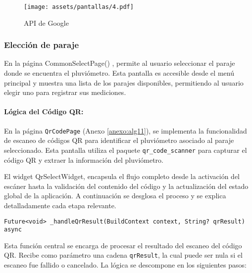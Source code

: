 \begin{figure}[h!]
\centering
  \texttt{[image: assets/pantallas/4.pdf]}
  \caption{API de Google}
  \label{pantallas4}
\end{figure}


\newpage
\subsubsection*{Elección de paraje}


En la página CommonSelectPage() %
, permite al usuario seleccionar el paraje donde se encuentra el pluviómetro. Esta pantalla es accesible desde el menú principal y muestra una lista de los parajes disponibles, permitiendo al usuario elegir uno para registrar sus mediciones.


\paragraph{Lógica del Código QR:}

En la página \texttt{QrCodePage} (Anexo \ref{anexo:alg11}), se implementa la funcionalidad de escaneo de códigos QR para identificar el pluviómetro asociado al paraje seleccionado. Esta pantalla utiliza el paquete \texttt{qr\_code\_scanner} para capturar el código QR y extraer la información del pluviómetro.



El widget QrSelectWidget, encapsula el flujo completo desde la activación del escáner hasta la validación del contenido del código y la actualización del estado global de la aplicación. A continuación se desglosa el proceso y se explica detalladamente cada etapa relevante.

\begin{verbatim}
Future<void> _handleQrResult(BuildContext context, String? qrResult) async
\end{verbatim}

Esta función central se encarga de procesar el resultado del escaneo del código QR. Recibe como parámetro una cadena \texttt{qrResult}, la cual puede ser nula si el escaneo fue fallido o cancelado. La lógica se descompone en los siguientes pasos:

